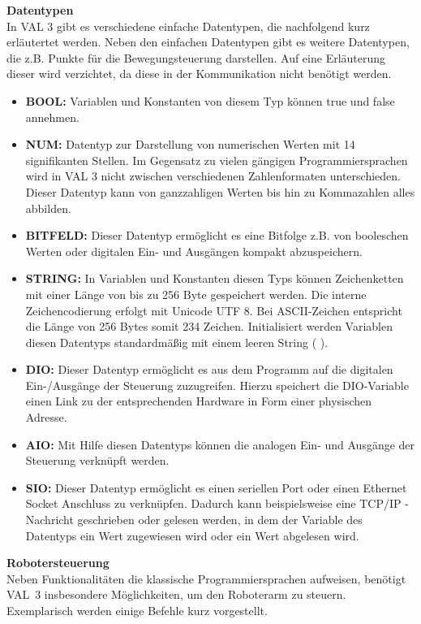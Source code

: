 \documentclass[ a4paper,
                oneside,
                toc=bibliography,
                toc=listof
                ]{scrbook}
\begin{document}
   	\textbf{Datentypen}\\
   	In VAL 3 gibt es verschiedene einfache Datentypen, die nachfolgend kurz erläutertet werden. Neben den einfachen Datentypen gibt es weitere Datentypen, die z.B. Punkte für die Bewegungsteuerung darstellen. Auf eine Erläuterung dieser wird verzichtet, da diese in der Kommunikation nicht benötigt werden.
   	\begin{itemize}
   		\item \textbf{BOOL:} Variablen und Konstanten von diesem Typ können \glqq true\grqq{} und \glqq false\grqq{} annehmen.
   		\item \textbf{NUM:} Datentyp zur Darstellung von numerischen Werten mit 14 signifikanten Stellen. Im Gegensatz zu vielen gängigen Programmiersprachen wird in VAL 3 nicht zwischen verschiedenen Zahlenformaten unterschieden. Dieser Datentyp kann von ganzzahligen Werten bis hin zu Kommazahlen alles abbilden.
   		\item \textbf{BITFELD:} Dieser Datentyp ermöglicht es eine Bitfolge z.B. von booleschen Werten oder digitalen Ein- und Ausgängen kompakt abzuspeichern.
   		\item \textbf{STRING:} In Variablen und Konstanten diesen Typs können Zeichenketten mit einer Länge von bis zu 256 Byte gespeichert werden. Die interne Zeichencodierung erfolgt mit Unicode UTF 8. Bei ASCII-Zeichen entspricht die Länge von 256 Bytes somit 234 Zeichen. Initialisiert werden Variablen diesen Datentyps standardmäßig mit einem leeren String (\grqq{} \grqq).
   		\item \textbf{DIO:} Dieser Datentyp ermöglicht es aus dem Programm auf die digitalen Ein-/Ausgänge der Steuerung zuzugreifen. Hierzu speichert die DIO-Variable einen Link zu der entsprechenden Hardware in Form einer physischen Adresse.
   		\item \textbf{AIO:} Mit Hilfe diesen Datentyps können die analogen Ein- und Ausgänge der Steuerung verknüpft werden.
   		\item \textbf{SIO:} Dieser Datentyp ermöglicht es einen seriellen Port oder einen Ethernet Socket Anschluss zu verknüpfen. Dadurch kann beispielsweise eine TCP/IP - Nachricht geschrieben oder gelesen werden, in dem der Variable des Datentyps ein Wert zugewiesen wird oder ein Wert abgelesen wird. \\
   	\end{itemize}
   	\textbf{Robotersteuerung}\\
   	Neben Funktionalitäten die klassische Programmiersprachen aufweisen, benötigt VAL~3 insbesondere Möglichkeiten, um den Roboterarm zu steuern. Exemplarisch werden einige Befehle kurz vorgestellt.
\end{document}
